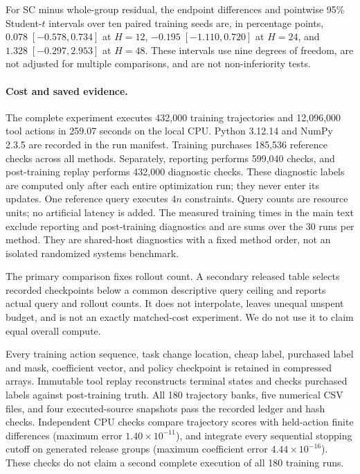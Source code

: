 For SC minus whole-group residual, the endpoint differences and pointwise
95\% Student-$t$ intervals over ten paired training seeds are, in percentage
points, $0.078\;[-0.578,0.734]$ at $H=12$,
$-0.195\;[-1.110,0.720]$ at $H=24$, and
$1.328\;[-0.297,2.953]$ at $H=48$. These intervals use nine degrees of freedom,
are not adjusted for multiple comparisons, and are not non-inferiority tests.

\paragraph{Cost and saved evidence.}
The complete experiment executes 432,000 training trajectories and 12,096,000
tool actions in 259.07 seconds on the local CPU. Python 3.12.14 and NumPy 2.3.5
are recorded in the run manifest. Training purchases 185,536 reference checks
across all methods. Separately, reporting performs 599,040 checks, and
post-training replay performs 432,000 diagnostic checks. These diagnostic
labels are computed only after each entire optimization run; they never
enter its updates. One reference query executes $4n$ constraints. Query counts
are resource units; no artificial latency is added. The measured training
times in the main text exclude reporting and post-training diagnostics and
are sums over the 30 runs per method. They are shared-host diagnostics with a
fixed method order, not an isolated randomized systems benchmark.

The primary comparison fixes rollout count. A secondary released table selects
recorded checkpoints below a common descriptive query ceiling and reports
actual query and rollout counts. It does not interpolate, leaves unequal
unspent budget, and is not an exactly matched-cost experiment. We do not use
it to claim equal overall compute.

Every training action sequence, task change location, cheap label, purchased
label and mask, coefficient vector, and policy checkpoint is retained in
compressed arrays. Immutable tool replay reconstructs terminal states and
checks purchased labels against post-training truth. All 180 trajectory banks,
five numerical CSV files, and four executed-source snapshots pass the recorded
ledger and hash checks. Independent CPU checks compare trajectory scores with
held-action finite differences (maximum error $1.40\times10^{-11}$), and
integrate every sequential stopping cutoff on generated release groups
(maximum coefficient error $4.44\times10^{-16}$). These checks do not claim a
second complete execution of all 180 training runs.
